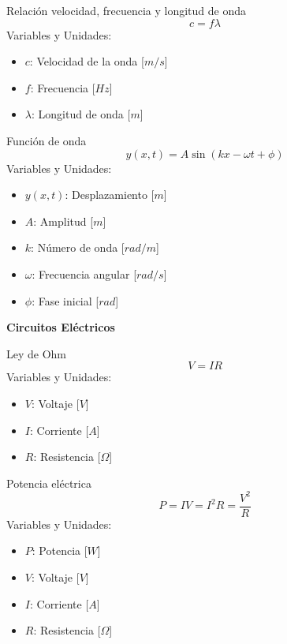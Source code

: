 \begin{landscape}
\begin{multicols}{3}
\begin{teorema}{Relación velocidad, frecuencia y longitud de onda}
    $$c = f \lambda$$
    Variables y Unidades:
    \begin{itemize}
        \item $c$: Velocidad de la onda [$m/s$]
        \item $f$: Frecuencia [$Hz$]
        \item $\lambda$: Longitud de onda [$m$]
    \end{itemize}
\end{teorema}

\begin{teorema}{Función de onda}
    $$y(x,t) = A \sin(kx - \omega t + \phi)$$
    Variables y Unidades:
    \begin{itemize}
        \item $y(x,t)$: Desplazamiento [$m$]
        \item $A$: Amplitud [$m$]
        \item $k$: Número de onda [$rad/m$]
        \item $\omega$: Frecuencia angular [$rad/s$]
        \item $\phi$: Fase inicial [$rad$]
    \end{itemize}
\end{teorema}

\end{multicols}

\newpage

\begin{center}
    \LARGE \textbf{Circuitos Eléctricos}
\end{center}

\begin{multicols}{3}

\begin{teorema}{Ley de Ohm}
    $$V = I R$$
    Variables y Unidades:
    \begin{itemize}
        \item $V$: Voltaje [$V$]
        \item $I$: Corriente [$A$]
        \item $R$: Resistencia [$\Omega$]
    \end{itemize}
\end{teorema}

\begin{teorema}{Potencia eléctrica}
    $$P = I V = I^2 R = \frac{V^2}{R}$$
    Variables y Unidades:
    \begin{itemize}
        \item $P$: Potencia [$W$]
        \item $V$: Voltaje [$V$]
        \item $I$: Corriente [$A$]
        \item $R$: Resistencia [$\Omega$]
    \end{itemize}
\end{teorema}


\end{multicols}
\end{landscape}
